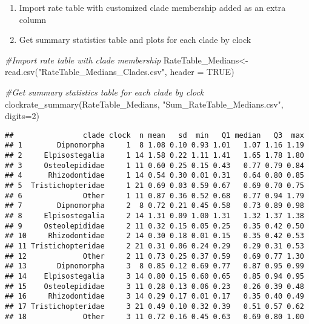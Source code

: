 \documentclass[
]{article}
\newenvironment{Shaded}{\begin{snugshade}}{\end{snugshade}}
\newcommand{\AttributeTok}[1]{\textcolor[rgb]{0.77,0.63,0.00}{#1}}
\newcommand{\CommentTok}[1]{\textcolor[rgb]{0.56,0.35,0.01}{\textit{#1}}}
\newcommand{\ConstantTok}[1]{\textcolor[rgb]{0.00,0.00,0.00}{#1}}
\newcommand{\DecValTok}[1]{\textcolor[rgb]{0.00,0.00,0.81}{#1}}
\newcommand{\FunctionTok}[1]{\textcolor[rgb]{0.00,0.00,0.00}{#1}}
\newcommand{\NormalTok}[1]{#1}
\newcommand{\OtherTok}[1]{\textcolor[rgb]{0.56,0.35,0.01}{#1}}
\newcommand{\StringTok}[1]{\textcolor[rgb]{0.31,0.60,0.02}{#1}}
\providecommand{\tightlist}{%
  \setlength{\itemsep}{0pt}\setlength{\parskip}{0pt}}
\begin{document}
\begin{enumerate}
\def\labelenumi{\arabic{enumi}.}
\setcounter{enumi}{2}
\tightlist
\item
  Import rate table with customized clade membership added as an extra
  column
\item
  Get summary statistics table and plots for each clade by clock
\end{enumerate}

\begin{Shaded}
\begin{Highlighting}[]
\CommentTok{\#Import rate table with clade membership }
\NormalTok{RateTable\_Medians}\OtherTok{\textless{}{-}} \FunctionTok{read.csv}\NormalTok{(}\StringTok{"RateTable\_Medians\_Clades.csv"}\NormalTok{, }\AttributeTok{header =} \ConstantTok{TRUE}\NormalTok{)}

\CommentTok{\#Get summary statistics table for each clade by clock }
\FunctionTok{clockrate\_summary}\NormalTok{(RateTable\_Medians, }\StringTok{"Sum\_RateTable\_Medians.csv"}\NormalTok{, }\AttributeTok{digits=}\DecValTok{2}\NormalTok{)}
\end{Highlighting}
\end{Shaded}

\begin{verbatim}
##                clade clock  n mean   sd  min   Q1 median   Q3  max
## 1        Dipnomorpha     1  8 1.08 0.10 0.93 1.01   1.07 1.16 1.19
## 2     Elpisostegalia     1 14 1.58 0.22 1.11 1.41   1.65 1.78 1.80
## 3     Osteolepididae     1 11 0.60 0.25 0.15 0.43   0.77 0.79 0.84
## 4      Rhizodontidae     1 14 0.54 0.30 0.01 0.31   0.64 0.80 0.85
## 5  Tristichopteridae     1 21 0.69 0.03 0.59 0.67   0.69 0.70 0.75
## 6              Other     1 11 0.87 0.36 0.52 0.68   0.77 0.94 1.79
## 7        Dipnomorpha     2  8 0.72 0.21 0.45 0.58   0.73 0.89 0.98
## 8     Elpisostegalia     2 14 1.31 0.09 1.00 1.31   1.32 1.37 1.38
## 9     Osteolepididae     2 11 0.32 0.15 0.05 0.25   0.35 0.42 0.50
## 10     Rhizodontidae     2 14 0.30 0.18 0.01 0.15   0.35 0.42 0.53
## 11 Tristichopteridae     2 21 0.31 0.06 0.24 0.29   0.29 0.31 0.53
## 12             Other     2 11 0.73 0.25 0.37 0.59   0.69 0.77 1.30
## 13       Dipnomorpha     3  8 0.85 0.12 0.69 0.77   0.87 0.95 0.99
## 14    Elpisostegalia     3 14 0.80 0.15 0.60 0.65   0.85 0.94 0.95
## 15    Osteolepididae     3 11 0.28 0.13 0.06 0.23   0.26 0.39 0.48
## 16     Rhizodontidae     3 14 0.29 0.17 0.01 0.17   0.35 0.40 0.49
## 17 Tristichopteridae     3 21 0.49 0.10 0.32 0.39   0.51 0.57 0.62
## 18             Other     3 11 0.72 0.16 0.45 0.63   0.69 0.80 1.00
\end{verbatim}
\end{document}
